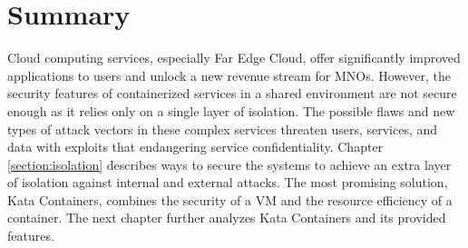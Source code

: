 \section{Summary}

Cloud computing services, especially Far Edge Cloud, offer significantly improved applications to users and unlock a new revenue stream for MNOs. However, the security features of containerized services in a shared environment are not secure enough as it relies only on a single layer of isolation. The possible flaws and new types of attack vectors in these complex services threaten users, services, and data with exploits that endangering service confidentiality. Chapter \ref{section:isolation} describes ways to secure the systems to achieve an extra layer of isolation against internal and external attacks. The most promising solution, Kata Containers, combines the security of a VM and the resource efficiency of a container. The next chapter further analyzes Kata Containers and its provided features.